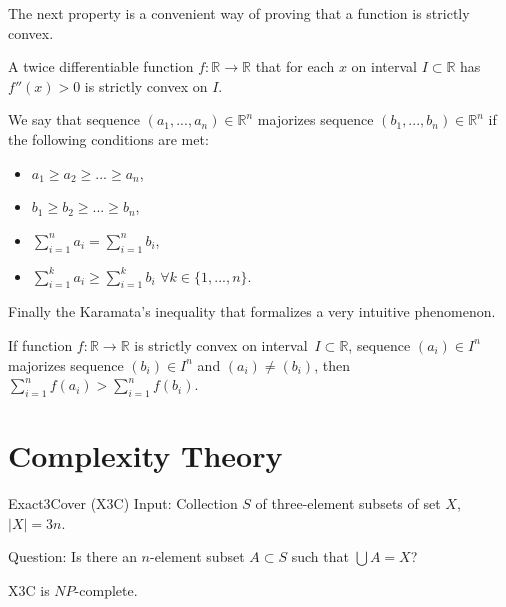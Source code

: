 The next property is a convenient way of proving that a function is strictly convex.

\begin{prp}
A twice differentiable function $f:\mathbb{R}\rightarrow\mathbb{R}$
that for each $x$ on interval $I \subset \mathbb{R}$ has $f''(x) > 0$
is strictly convex on $I$.
\end{prp}

\begin{defn}[majorization]
We say that sequence $(a_1, ..., a_n) \in \mathbb{R}^n$ majorizes sequence $(b_1, ..., b_n) \in \mathbb{R}^n$
if the following conditions are met:
\begin{itemize}
	\item $a_1 \geq a_2 \geq ... \geq a_n$,
	\item $b_1 \geq b_2 \geq ... \geq b_n$,
	\item $\sum_{i=1}^n a_i = \sum_{i=1}^n b_i$,
	\item $\sum_{i=1}^k a_i \geq \sum_{i=1}^k b_i$ $\forall k \in \{ 1, ..., n\}$.
\end{itemize}
\end{defn}

Finally the Karamata's inequality that formalizes a very intuitive phenomenon.

\begin{thm} \label{thm:Kar}
If function $f:\mathbb{R}\rightarrow\mathbb{R}$ is strictly convex on interval~$I \subset \mathbb{R}$,
sequence $(a_i) \in I^n$ majorizes sequence $(b_i) \in I^n$ and $(a_i) \neq (b_i)$, then
$\sum_{i=1}^n f(a_i) > \sum_{i=1}^n f(b_i)$.
\end{thm}


\section{Complexity Theory}



\begin{problem}{Exact3Cover (X3C)}
	Input: Collection $S$ of three-element subsets of set $X$, $\vert{X}\vert = 3n$.

	Question: Is there an $n$-element subset $A \subset S$ such that $\bigcup A = X$?
\end{problem}

\begin{thm}
\textsc{X3C} is $NP$-complete.
\end{thm}


